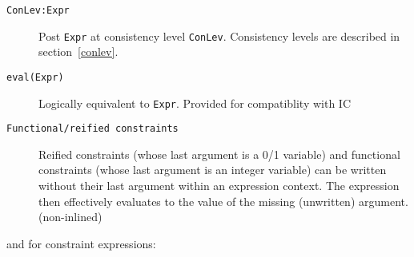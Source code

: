 \begin{description}
\item[\texttt{ConLev:Expr}]
    Post \texttt{Expr} at consistency level \texttt{ConLev}. Consistency
    levels are described in section~\ref{conlev}. 

\item[\texttt{eval(Expr)}]
            Logically equivalent to \verb'Expr'. Provided for compatiblity
	    with IC

\item[\texttt{Functional/reified constraints}]
            Reified constraints (whose last argument is a 0/1 variable)
            and functional constraints (whose last argument is an integer
            variable) can be written without their last argument within
            an expression context.  The expression then effectively
            evaluates to the value of the missing (unwritten) argument.
	    (non-inlined)

\end{description}
and for constraint expressions: 

